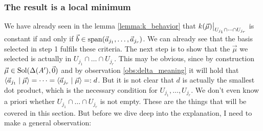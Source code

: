 \subsubsection{The result is a local minimum}
We have already seen in the lemma \ref{lemma:k_behavior} that $\restrict{k(\vec\mu)}{U_{j_1}\cap \dots \cap U_{j_r}}$ is constant if and only if $\vec b \in \operatorname{span}(\vec a_{j_1}, \dots, \vec a_{j_r})$. We can already see that the basis selected in step 1 fulfils these criteria. The next step is to show that the $\vec\mu$ we selected is actually in $U_{j_1} \cap \dots \cap U_{j_r}$. This may be obvious, since by construction $\vec\mu \in \operatorname{Sol}(\Delta(A'), \vec 0)$ and by observation \ref{obs:delta_meaning} it will hold that $\langle \vec a_{j_1} \mid \vec\mu \rangle = \dots = \langle \vec a_{j_r} \mid \vec\mu \rangle =: d$. But it is not clear that $d$ is actually the smallest dot product, which is the necessary condition for $U_{j_1}, \dots, U_{j_r}$. We don't even know a priori whether ${U_{j_1} \cap \dots \cap U_{j_r}}$ is not empty. These are the things that will be covered in this section. But before we dive deep into the explanation, I need to make a general observation:

